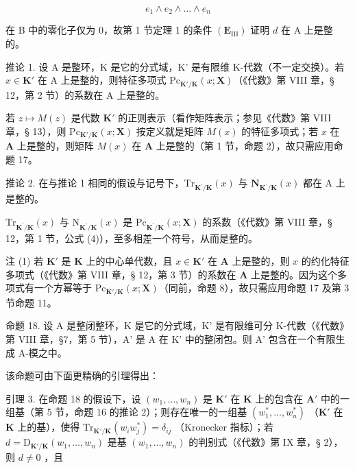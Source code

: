 \[
e _ {1} \wedge e _ {2} \wedge \dots \wedge e _ {n}
\]

在 B 中的零化子仅为 0，故第 1 节定理 1 的条件 \((\mathbf{E}_{\mathrm{III}})\) 证明 \(d\) 在 A 上是整的。

推论 1. 设 A 是整环，K 是它的分式域，K' 是有限维 K-代数（不一定交换）。若 \(x \in \mathbf{K}'\) 在 A 上是整的，则特征多项式 \(\mathrm{Pc}_{\mathbf{K}' / \mathbf{K}}(x; \mathbf{X})\)（《代数》第 VIII 章，§ 12，第 2 节）的系数在 A 上是整的。

若 \(z \mapsto M(z)\) 是代数 \(\mathbf{K}'\) 的正则表示（看作矩阵表示；参见《代数》第 VIII 章，§ 13），则 \(\mathrm{Pc}_{\mathbf{K}' / \mathbf{K}}(x; \mathbf{X})\) 按定义就是矩阵 \(M(x)\) 的特征多项式；若 \(x\) 在 \(\mathbf{A}\) 上是整的，则矩阵 \(M(x)\) 在 \(\mathbf{A}\) 上是整的（第 1 节，命题 2），故只需应用命题 17。

推论 2. 在与推论 1 相同的假设与记号下，\(\mathrm{Tr}_{\mathbf{K}^{\prime}/\mathbf{K}}(x)\) 与 \(\mathbf{N}_{\mathbf{K}^{\prime}/\mathbf{K}}(x)\) 都在 A 上是整的。

\(\mathrm{Tr}_{\mathbf{K}^{\prime}/\mathbf{K}}(x)\) 与 \(\mathrm{N}_{\mathbf{K}^{\prime}/\mathbf{K}}(x)\) 是 \(\mathrm{Pc}_{\mathbf{K}^{\prime}/\mathbf{K}}(x;\mathbf{X})\) 的系数（《代数》第 VIII 章，§ 12，第 1 节，公式 (4)），至多相差一个符号，从而是整的。

注 (1) 若 \(\mathbf{K}'\) 是 \(\mathbf{K}\) 上的中心单代数，且 \(x \in \mathbf{K}'\) 在 \(\mathbf{A}\) 上是整的，则 \(x\) 的约化特征多项式（《代数》第 VIII 章，§ 12，第 3 节）的系数在 \(\mathbf{A}\) 上是整的。因为这个多项式有一个方幂等于 \(\mathrm{Pc}_{\mathbf{K}' / \mathbf{K}}(x; \mathbf{X})\)（同前，命题 8），故只需应用命题 17 及第 3 节命题 11。

命题 18. 设 A 是整闭整环，K 是它的分式域，K' 是有限维可分 K-代数（《代数》第 VIII 章，§7，第 5 节），A' 是 A 在 K' 中的整闭包。则 A' 包含在一个有限生成 A-模之中。

该命题可由下面更精确的引理得出：

引理 3. 在命题 18 的假设下，设 \((w_{1},\ldots ,w_{n})\) 是 \(\mathbf{K}'\) 在 \(\mathbf{K}\) 上的包含在 \(\mathbf{A}'\) 中的一组基（第 5 节，命题 16 的推论 2）；则存在唯一的一组基 \((w_{1}^{*},\dots ,w_{n}^{*})\) （\(\mathbf{K}'\) 在 \(\mathbf{K}\) 上的基），使得 \(\mathrm{Tr}_{\mathbf{K}' / \mathbf{K}}(w_i w_j^*) = \delta_{ij}\) （Kronecker 指标）；若 \(d = \mathrm{D}_{\mathbf{K}' / \mathbf{K}}(w_1,\dots ,w_n)\) 是基 \((w_{1},\dots ,w_{n})\) 的判别式（《代数》第 IX 章，§ 2），则 \(d\neq 0\) ，且

